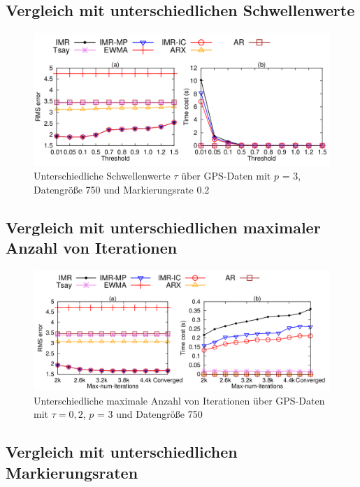 \subsection{Vergleich mit unterschiedlichen Schwellenwerte}
\begin{figure}[htbp]
    \centering
    \includegraphics[width=\textwidth]{../plots/varying_threshold.png}
    \caption{Unterschiedliche Schwellenwerte $\tau$ über GPS-Daten mit $p$ = 3, Datengröße 750 und Markierungsrate 0.2}%
    \label{varying_threshold}
\end{figure}
\subsection{Vergleich mit unterschiedlichen maximaler Anzahl von Iterationen}
\begin{figure}[htbp]
    \centering
    \includegraphics[width=\textwidth]{../plots/varying_maximum_number.png}
    \caption{Unterschiedliche maximale Anzahl von Iterationen über GPS-Daten mit $\tau = 0,2$, $p$ = 3 und Datengröße 750}%
    \label{varying_maximum_number}
\end{figure}
\subsection{Vergleich mit unterschiedlichen Markierungsraten}

